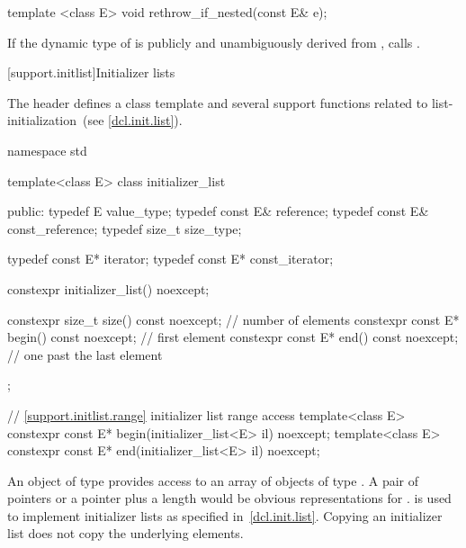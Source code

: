 \begin{itemdecl}
template <class E> void rethrow_if_nested(const E& e);
\end{itemdecl}

\begin{itemdescr}
\pnum
\effects
If the dynamic type of  is publicly and unambiguously derived from
, calls
 .
\end{itemdescr}


[support.initlist]{Initializer lists}

%
%
\pnum
The header  defines a class template and several
support functions related to list-initialization~(see \ref{dcl.init.list}).


%
%
%
\begin{codeblock}
namespace std {
  template<class E> class initializer_list {
  public:
    typedef E value_type;
    typedef const E& reference;
    typedef const E& const_reference;
    typedef size_t size_type;

    typedef const E* iterator;
    typedef const E* const_iterator;

    constexpr initializer_list() noexcept;

    constexpr size_t size() const noexcept;      // number of elements
    constexpr const E* begin() const noexcept;   // first element
    constexpr const E* end() const noexcept;     // one past the last element
  };

  // \ref{support.initlist.range} initializer list range access
  template<class E> constexpr const E* begin(initializer_list<E> il) noexcept;
  template<class E> constexpr const E* end(initializer_list<E> il) noexcept;
}
\end{codeblock}

\pnum
An object of type  provides access to an array of
objects of type . \enternote A pair of pointers or a pointer plus
a length would be obvious representations for .
 is used to implement initializer lists as specified
in~\ref{dcl.init.list}. Copying an initializer list does not copy the underlying
elements. \exitnote

